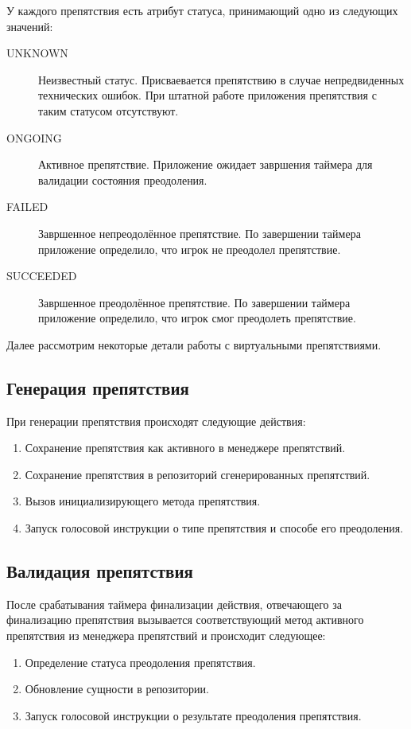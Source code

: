У каждого препятствия есть атрибут статуса, принимающий одно из следующих значений:
\begin{description}
	\item[UNKNOWN] Неизвестный статус. Присваевается препятствию в случае непредвиденных технических ошибок. При штатной работе приложения препятствия с таким статусом отсутствуют.
	\item[ONGOING] Активное препятствие. Приложение ожидает завршения таймера для валидации состояния преодоления.
	\item[FAILED] Завршенное непреодолённое препятствие. По завершении таймера приложение определило, что игрок не преодолел препятствие.
	\item[SUCCEEDED] Завршенное преодолённое препятствие. По завершении таймера приложение определило, что игрок смог преодолеть препятствие.
\end{description}
\smallskip
Далее рассмотрим некоторые детали работы с виртуальными препятствиями.
\subsection*{Генерация препятствия}
При генерации препятствия происходят следующие действия:
\begin{enumerate}
	\item Сохранение препятствия как активного в менеджере препятствий.
	\item Сохранение препятствия в репозиторий сгенерированных препятствий.
	\item Вызов инициализирующего метода препятствия.
	\item Запуск голосовой инструкции о типе препятствия и способе его преодоления.
\end{enumerate}

\subsection*{Валидация препятствия}
После срабатывания таймера финализации действия, отвечающего за финализацию препятствия вызывается соответствующий метод активного препятствия из менеджера препятствий и происходит следующее:
\begin{enumerate}
	\item Определение статуса преодоления препятствия.
	\item Обновление сущности в репозитории.
	\item Запуск голосовой инструкции о результате преодоления препятствия.
\end{enumerate}

